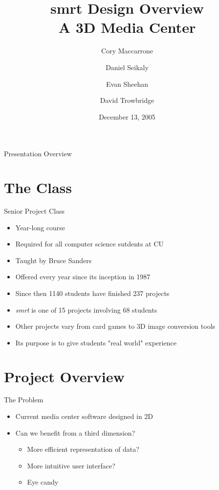 \documentclass[style=smrt,mode=present,paper=screen]{powerdot}
\title{\huge{\textbf{smrt Design Overview}} \\ \small{A 3D Media Center}}
\author {
	Cory Maccarrone
	\and
	Daniel Seikaly
	\and
	Evan Sheehan
	\and
	David Trowbridge
}
\date{December 13, 2005}
\begin{document}
\maketitle


\begin{slide}[toc=,bm=]{Presentation Overview}
\tableofcontents[type=0,content=sections]
\end{slide}

\section[slide=false]{The Class}
\begin{slide}{Senior Project Class}
\begin{itemize}
\item Year-long course
\item Required for all computer science sutdents at CU
\item Taught by Bruce Sanders
\item Offered every year since its inception in 1987
\item Since then 1140 students have finished 237 projects
\item \textit{smrt} is one of 15 projects involving 68 students
\item Other projects vary from card games to 3D image conversion tools
\item Its purpose is to give students "real world" experience
\end{itemize}
\end{slide}

\section{Project Overview}

\begin{slide}{The Problem}
\begin{itemize}
\item Current media center software designed in 2D
\item Can we benefit from a third dimension?
\begin{itemize}
	\item More efficient representation of data?
	\item More intuitive user interface?
	\item Eye candy
\end{itemize}
\end{itemize}
\end{slide}
\end{document}
